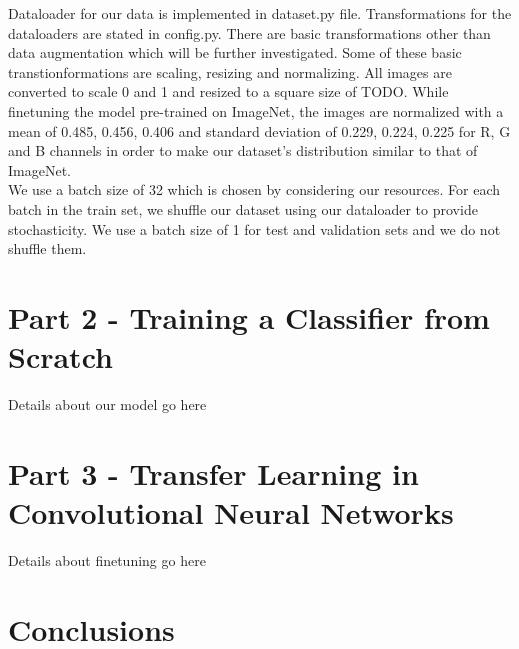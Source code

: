 \documentclass{article}
\begin{document}
Dataloader for our data is implemented in dataset.py file. Transformations for the dataloaders are stated in config.py. There are basic transformations other than data augmentation which will be further investigated. Some of these basic transtionformations are scaling, resizing and normalizing. All images are converted to scale 0 and  1 and resized to a square size of TODO. While finetuning the model pre-trained on ImageNet, the images are normalized with a mean of 0.485, 0.456, 0.406 and standard deviation of 0.229, 0.224, 0.225 for R, G and B channels in order to make our dataset's distribution similar to that of ImageNet.\\

We use a batch size of 32 which is chosen by considering our resources. For each batch in the train set,  we shuffle our dataset using our dataloader to provide stochasticity. We use a batch size of 1 for test and validation sets and we do not shuffle them.

\section{Part 2 - Training a Classifier from Scratch}

Details about our model go here

\section{Part 3 - Transfer Learning in Convolutional Neural Networks}

Details about finetuning go here 


\section{Conclusions}
 
{\small


}
\end{document}
